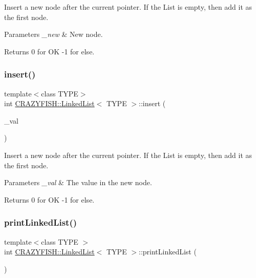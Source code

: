 Insert a new node after the current pointer. If the List is empty, then add it as the first node.


\begin{DoxyParams}{Parameters}
{\em \+\_\+new} & New node.\\
\hline
\end{DoxyParams}
\begin{DoxyReturn}{Returns}
0 for OK -\/1 for else. 
\end{DoxyReturn}
\mbox{\label{classCRAZYFISH_1_1LinkedList_a431acbe0a25d8e3d56994fcd427d21d7}} 
\subsubsection{\texorpdfstring{insert()}{insert()}\hspace{0.1cm}{\footnotesize\ttfamily [2/2]}}
{\footnotesize\ttfamily template$<$class T\+Y\+PE$>$ \\
int \hyperlink{classCRAZYFISH_1_1LinkedList}{C\+R\+A\+Z\+Y\+F\+I\+S\+H\+::\+Linked\+List}$<$ T\+Y\+PE $>$\+::insert (\begin{DoxyParamCaption}\item[{T\+Y\+PE \&}]{\+\_\+val }\end{DoxyParamCaption})}

Insert a new node after the current pointer. If the List is empty, then add it as the first node.


\begin{DoxyParams}{Parameters}
{\em \+\_\+val} & The value in the new node.\\
\hline
\end{DoxyParams}
\begin{DoxyReturn}{Returns}
0 for OK -\/1 for else. 
\end{DoxyReturn}
\mbox{\label{classCRAZYFISH_1_1LinkedList_aef8407ee5167b26ed5a5707fc2886fb8}} 
\subsubsection{\texorpdfstring{print\+Linked\+List()}{printLinkedList()}}
{\footnotesize\ttfamily template$<$class T\+Y\+PE $>$ \\
int \hyperlink{classCRAZYFISH_1_1LinkedList}{C\+R\+A\+Z\+Y\+F\+I\+S\+H\+::\+Linked\+List}$<$ T\+Y\+PE $>$\+::print\+Linked\+List (\begin{DoxyParamCaption}{ }\end{DoxyParamCaption})}

